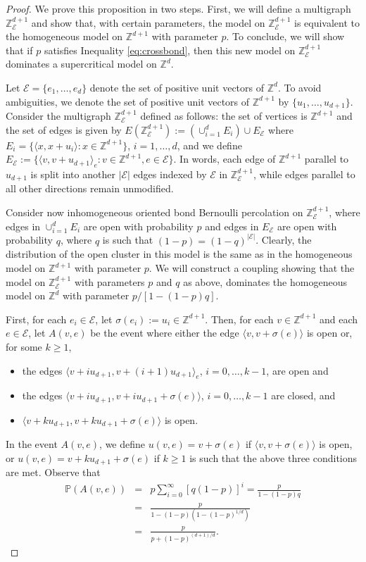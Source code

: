 \documentclass{aptpub}
\newcommand{\Z}{\mathbb{Z}}
\newcommand{\Pp}{\mathbb{P}}
\newcommand{\Ee}{\mathcal{E}}
\begin{document}
\begin{proof} 
We prove this proposition in two steps. First, we will define a multigraph $\Z^{d+1}_{\mathcal{E}}$ and show that, with certain parameters, the model on $\Z^{d+1}_{\Ee}$ is equivalent to the homogeneous model on $\Z^{d+1}$ with parameter $p$. To conclude, we will show that if $p$ satisfies Inequality \eqref{eq:crossbond}, then this new model on $\Z^{d+1}_{\Ee}$ dominates a supercritical model on $\Z^{d}$.

Let ${\Ee} = \{e_1, \dots, e_d\}$ denote the set of positive unit vectors of $\Z^d$. To avoid ambiguities, we denote the set of positive unit vectors of $\Z^{d+1}$ by $\{ u_1, \dots, u_{d+1}\}$. Consider the multigraph $\Z^{d+1}_{\Ee}$ defined as follows: the set of vertices is $\Z^{d+1}$ and the set of edges is given by $E(\Z^{d+1}_{\Ee}):= \left( \cup_{i=1}^d E_i \right) \cup E_{\Ee}$ where  $E_i = \{ \langle x, x + u_i \rangle: x \in \Z^{d+1}\}$, $i=1, \dots, d$, and we define $E_{\Ee} := \{\langle v, v+u_{d+1}\rangle_e : v \in \Z^{d+1} , e \in {\Ee}\}$. In words, each edge of $\Z^{d+1}$ parallel to $u_{d+1}$ is split into another $|{\Ee}|$ edges indexed by ${\Ee}$ in $\Z^{d+1}_{\Ee}$, while edges parallel to all other directions remain unmodified.


Consider now inhomogeneous oriented bond Bernoulli percolation on $\Z^{d+1}_{\Ee}$, where edges in $\cup_{i=1}^d E_i$ are open with probability $p$ and edges in $E_{\Ee}$ are open with probability $q$, where $q$ is such that $(1-p) = (1-q)^{|{\Ee}|}$. Clearly, the distribution of the  open cluster in this model is the same as in the homogeneous model on $\Z^{d+1}$ with parameter $p$.  We will construct a coupling showing that the model on $\Z_{\Ee}^{d+1}$ with parameters $p$ and $q$ as above, dominates the homogeneous model on $\Z^d$ with parameter $p/[1 - (1-p)q]$. 

First, for each $e_i \in \Ee$, let $ \sigma(e_i):= u_i \in \Z^{d+1}$. Then,  for each $v \in \Z^{d+1}$ and each $e \in {\Ee}$, let $A(v,e)$ be the event where either the edge $\langle v, v+\sigma(e) \rangle$ is open or, for some $k \geq 1$,
\begin{itemize}
    \item the edges $\langle v+ iu_{d+1}, v + (i+1)u_{d+1}  \rangle_e$, $i = 0, \dots, k-1$, are open and
    \item the edges $\langle v + iu_{d+1}, v + iu_{d+1} + \sigma(e) \rangle$, $i = 0, \dots, k-1$ are closed, and 
    \item $\langle v + ku_{d+1}, v + ku_{d+1} + \sigma(e) \rangle$ is open.
\end{itemize}
In the event  $A(v,e)$, we define $u(v,e) = v+\sigma(e)$ if $\langle v, v+\sigma(e) \rangle$ is open, or $u(v,e) = v + k u_{d+1} + \sigma(e)$ if $k \geq 1$ is such that the above three conditions are met. Observe  that
\begin{eqnarray*}
    \Pp(A(v,e)) &=& %
    p\sum_{i = 0}^{\infty} \left[q(1-p)\right]^i
    = \frac{p}{1 - (1-p)q}\\
    &=& \frac{p}{1-(1-p)(1-(1-p)^{1/d})} \\
    &=& \frac{p}{ p + (1-p)^{(d+1)/d} }.
\end{eqnarray*}


\end{proof}
\end{document}
